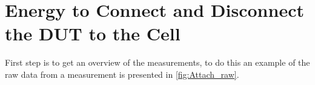 %
%
%

\section{Energy to Connect and Disconnect the DUT to the Cell} \label{sec:performance_attach}

First step is to get an overview of the measurements, to do this an example of the raw data from a measurement is presented in \autoref{fig:Attach_raw}.

